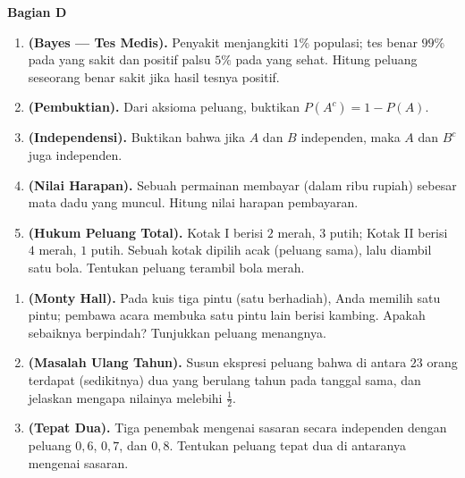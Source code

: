 \documentclass[11pt,a4paper]{report}
\theoremstyle{gaya}
\newcommand{\bagiansoal}[2]{%
  \par\medskip\noindent
  {\large\bfseries\color{biru}Bagian #1}\par\smallskip
  \addcontentsline{toc}{subsection}{Bagian #1}}
\begin{document}
\bagiansoal{D}{(Expert --- setara tahun pertama universitas, sintesis \& pembuktian)}
\begin{enumerate}[leftmargin=*]
  \item \textbf{(Bayes --- Tes Medis).} Penyakit menjangkiti $1\%$ populasi; tes benar $99\%$ pada yang sakit dan positif palsu $5\%$ pada yang sehat. Hitung peluang seseorang benar sakit jika hasil tesnya positif.
  \item \textbf{(Pembuktian).} Dari aksioma peluang, buktikan $P(A^c)=1-P(A)$.
  \item \textbf{(Independensi).} Buktikan bahwa jika $A$ dan $B$ independen, maka $A$ dan $B^c$ juga independen.
  \item \textbf{(Nilai Harapan).} Sebuah permainan membayar (dalam ribu rupiah) sebesar mata dadu yang muncul. Hitung nilai harapan pembayaran.
  \item \textbf{(Hukum Peluang Total).} Kotak I berisi $2$ merah, $3$ putih; Kotak II berisi $4$ merah, $1$ putih. Sebuah kotak dipilih acak (peluang sama), lalu diambil satu bola. Tentukan peluang terambil bola merah.
\end{enumerate}

\begin{challenge}
\begin{enumerate}[leftmargin=*,topsep=2pt]
  \item \textbf{(Monty Hall).} Pada kuis tiga pintu (satu berhadiah), Anda memilih satu pintu; pembawa acara membuka satu pintu lain berisi kambing. Apakah sebaiknya berpindah? Tunjukkan peluang menangnya.
  \item \textbf{(Masalah Ulang Tahun).} Susun ekspresi peluang bahwa di antara $23$ orang terdapat (sedikitnya) dua yang berulang tahun pada tanggal sama, dan jelaskan mengapa nilainya melebihi $\tfrac12$.
  \item \textbf{(Tepat Dua).} Tiga penembak mengenai sasaran secara independen dengan peluang $0{,}6$, $0{,}7$, dan $0{,}8$. Tentukan peluang tepat dua di antaranya mengenai sasaran.
\end{enumerate}
\end{challenge}

\end{document}
